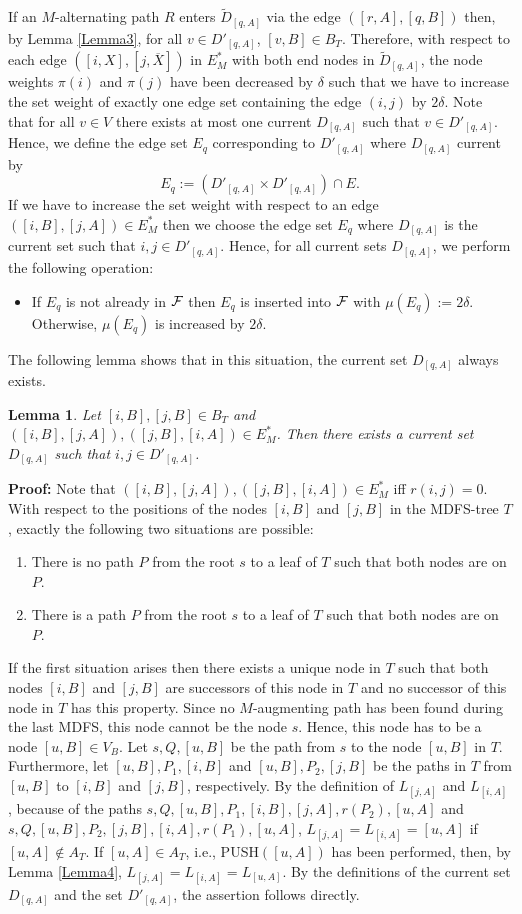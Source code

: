 \documentclass[12pt,twoside,a4paper]{article}
\newtheorem{lemma}{Lemma}
\begin{document}
If an $M$-alternating path $R$ enters $\tilde D_{[q,A]}$ via the edge 
$([r,A],[q,B])$ then, by Lemma \ref{Lemma3}, for all $v \in D'_{[q,A]}$, 
$[v,B] \in B_T$. Therefore, with respect to each edge $([i,X],[j,\overline{X}])$ 
in $E^*_M$ with both end nodes in $\tilde{D}_{[q,A]}$, the node weights $\pi(i)$ and
$\pi(j)$ have been decreased by $\delta$ such that we have to increase the set
weight of exactly one edge set containing the edge $(i,j)$ by $2\delta$.
Note that for all $v \in V$ there exists at most one current $D_{[q,A]}$
such that $v \in D'_{[q,A]}$. Hence, we define the edge set $E_q$ 
corresponding to $D'_{[q,A]}$ where $D_{[q,A]}$ current by
$$E_q := (D'_{[q,A]} \times D'_{[q,A]}) \cap E.$$
If we have to increase the set weight with respect to an edge $([i,B],[j,A]) \in E^*_M$ 
then we choose the edge set $E_q$ where $D_{[q,A]}$ is the current set such that 
$i,j \in D'_{[q,A]}$. Hence, for all current sets $D_{[q,A]}$, we perform the following
operation:
\begin{itemize}
\item
If $E_q$ is not already in $\cal F$ then $E_q$ is inserted into $\cal F$ with 
$\mu(E_q) := 2\delta$. Otherwise, $\mu(E_q)$ is increased by $2\delta$. 
\end{itemize}
The following lemma shows that in this situation, the current set $D_{[q,A]}$ always exists.
\begin{lemma} \label{pd1}
Let $[i,B],[j,B] \in B_T$ and $([i,B],[j,A]),([j,B],[i,A]) \in E^*_M$. Then there exists 
a current set $D_{[q,A]}$ such that $i,j \in D'_{[q,A]}$.
\end{lemma} 
{\bf Proof:} 
Note that $([i,B],[j,A]),([j,B],[i,A]) \in E^*_M$ iff $r(i,j) = 0$.
With respect to the positions of the nodes $[i,B]$ and $[j,B]$ in the MDFS-tree $T$, exactly
the following two situations are possible: 
\begin{enumerate}
\item
There is no path $P$ from the root $s$ to a leaf of $T$ such that both
nodes are on $P$.
\item
There is a path $P$ from the root $s$ to a leaf of $T$ such that both
nodes are on $P$.
\end{enumerate}
If the first situation arises then there exists a unique node in $T$ such that both nodes 
$[i,B]$ and $[j,B]$ are successors of this node in $T$ and no successor of this node in $T$ 
has this property. Since no $M$-augmenting path has been found during the last MDFS, this 
node cannot be the node $s$. Hence, this node has to be a node $[u,B] \in V_B$.
Let $s,Q,[u,B]$ be the path from $s$ to the node $[u,B]$ in $T$. Furthermore,
let $[u,B],P_1,[i,B]$ and $[u,B],P_2,[j,B]$ be the paths in $T$ from $[u,B]$ to $[i,B]$ and 
$[j,B]$, respectively. 
By the definition of $L_{[j,A]}$ and $L_{[i,A]}$,
because of the paths $s,Q,[u,B],P_1,[i,B],[j,A],r(P_2),[u,A]$ and
$s,Q,[u,B],P_2,[j,B],[i,A],r(P_1),[u,A]$, $L_{[j,A]} = L_{[i,A]} = [u,A]$ if $[u,A] \not\in A_T$. 
If $[u,A] \in A_T$, i.e., PUSH$([u,A])$ has been performed, then, by Lemma \ref{Lemma4},
$L_{[j,A]} = L_{[i,A]} = L_{[u,A]}$. By the definitions of the current set $D_{[q,A]}$ and
the set $D'_{[q,A]}$, the assertion follows directly.
\end{document}
